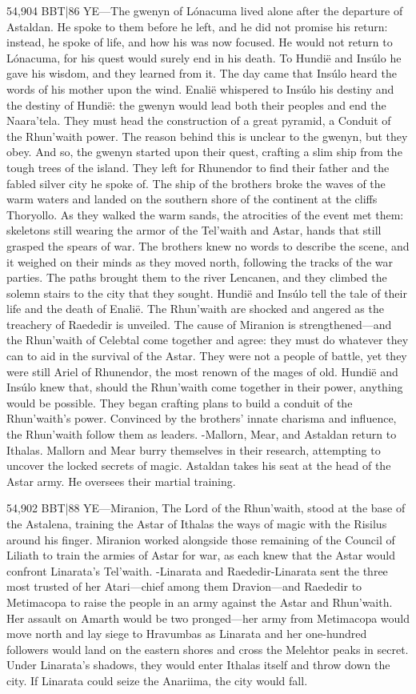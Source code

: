 \documentclass[smalldemyvopaper,11pt,twoside,onecolumn,openright,extrafontsizes]{memoir}
\begin{document}
54,904 BBT|86 YE—The gwenyn of Lónacuma lived alone after the departure of Astaldan. He spoke to them before he left, and he did not promise his return: instead, he spoke of life, and how his was now focused. He would not return to Lónacuma, for his quest would surely end in his death. To Hundië and Insúlo he gave his wisdom, and they learned from it. The day came that Insúlo heard the words of his mother upon the wind. Enalië whispered to Insúlo his destiny and the destiny of Hundië: the gwenyn would lead both their peoples and end the Naara’tela. They must head the construction of a great pyramid, a Conduit of the Rhun’waith power. The reason behind this is unclear to the gwenyn, but they obey.
	And so, the gwenyn started upon their quest, crafting a slim ship from the tough trees of the island. They left for Rhunendor to find their father and the fabled silver city he spoke of. The ship of the brothers broke the waves of the warm waters and landed on the southern shore of the continent at the cliffs Thoryollo. As they walked the warm sands, the atrocities of the event met them: skeletons still wearing the armor of the Tel’waith and Astar, hands that still grasped the spears of war. The brothers knew no words to describe the scene, and it weighed on their minds as they moved north, following the tracks of the war parties. The paths brought them to the river Lencanen, and they climbed the solemn stairs to the city that they sought.
Hundië and Insúlo tell the tale of their life and the death of Enalië. The Rhun’waith are shocked and angered as the treachery of Raededir is unveiled. The cause of Miranion is strengthened—and the Rhun’waith of Celebtal come together and agree: they must do whatever they can to aid in the survival of the Astar. They were not a people of battle, yet they were still Ariel of Rhunendor, the most renown of the mages of old. Hundië and Insúlo knew that, should the Rhun’waith come together in their power, anything would be possible. They began crafting plans to build a conduit of the Rhun’waith’s power. Convinced by the brothers’ innate charisma and influence, the Rhun’waith follow them as leaders.
-Mallorn, Mear, and Astaldan return to Ithalas. Mallorn and Mear burry themselves in their research, attempting to uncover the locked secrets of magic. Astaldan takes his seat at the head of the Astar army. He oversees their martial training.

54,902 BBT|88 YE—Miranion, The Lord of the Rhun’waith, stood at the base of the Astalena, training the Astar of Ithalas the ways of magic with the Risilus around his finger. Miranion worked alongside those remaining of the Council of Liliath to train the armies of Astar for war, as each knew that the Astar would confront Linarata’s Tel’waith.
-Linarata and Raededir-Linarata sent the three most trusted of her Atari—chief among them Dravion—and Raededir to Metimacopa to raise the people in an army against the Astar and Rhun’waith. Her assault on Amarth would be two pronged—her army from Metimacopa would move north and lay siege to Hravumbas as Linarata and her one-hundred followers would land on the eastern shores and cross the Melehtor peaks in secret. Under Linarata’s shadows, they would enter Ithalas itself and throw down the city. If Linarata could seize the Anariima, the city would fall.
\end{document}
